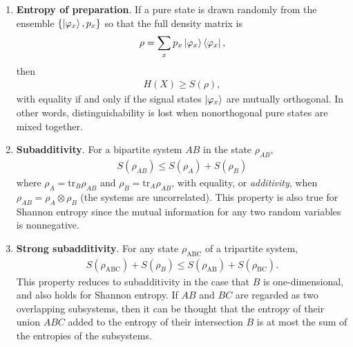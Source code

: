 \documentclass[a4paper, 12pt]{article}
\numberwithin{equation}{section}
\numberwithin{figure}{section}
\theoremstyle{definition}
\begin{document}
\begin{enumerate}[label=\textbf{(\arabic*)}]
        \item
            \textbf{Entropy of preparation}. If a pure state is drawn randomly from the ensemble $\{ \ket{\varphi_x}, p_x \}$ so that the full density matrix is
            \begin{align}
                \rho = \sum_x p_x \ket{\varphi_x} \bra{\varphi_x},
            \end{align}
            then
            \begin{align}
                H(X) \geq S(\rho),
            \end{align}
            with equality if and only if the signal states $\ket{\varphi_x}$ are mutually orthogonal. In other words, distinguishability is lost when nonorthogonal pure states are mixed together.

        \item
            \textbf{Subadditivity}. For a bipartite system $AB$ in the state $\rho_{AB}$,
            \begin{align}
                S(\rho_{AB}) \leq S(\rho_A) + S(\rho_B)
            \end{align}
            where $\rho_A = \text{tr}_B \rho_{AB}$ and $\rho_B = \text{tr}_A \rho_{AB}$, with equality, or \textit{additivity}, when $\rho_{AB} = \rho_A \otimes \rho_B$ (the systems are uncorrelated). This property is also true for Shannon entropy since the mutual information for any two random variables is nonnegative.

        \item
            \textbf{Strong subadditivity}. For any state $\rho_\text{ABC}$ of a tripartite system,
            \begin{align}
                S(\rho_\text{ABC}) + S(\rho_B) \leq S(\rho_\text{AB}) + S(\rho_\text{BC}).
            \end{align}
            This property reduces to subadditivity in the case that $B$ is one-dimensional, and also holds for Shannon entropy. If $AB$ and $BC$ are regarded as two overlapping subsystems, then it can be thought that the entropy of their union $ABC$ added to the entropy of their intersection $B$ is at most the sum of the entropies of the subsystems.


\end{enumerate}
\end{document}
